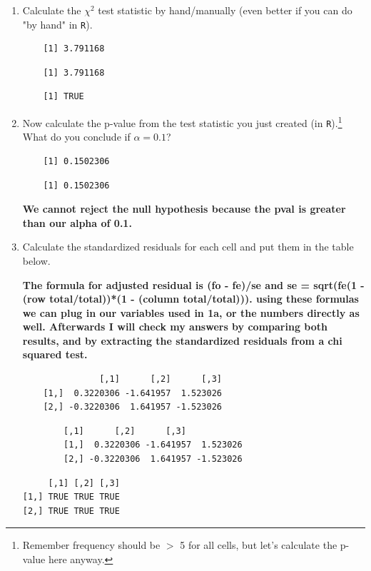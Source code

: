\documentclass[12pt,letterpaper]{article}
\begin{document}
\begin{enumerate}
	
	\item [(a)]
	Calculate the $\chi^2$ test statistic by hand/manually (even better if you can do "by hand" in \texttt{R}).\\	
	 
	\begin{verbatim}
	[1] 3.791168	
	\end{verbatim}
	 
	\begin{verbatim}
	[1] 3.791168
	\end{verbatim}
	 
	\begin{verbatim}
	[1] TRUE	
	\end{verbatim}
	
	\item [(b)]
	Now calculate the p-value from the test statistic you just created (in \texttt{R}).\footnote{Remember frequency should be $>$ 5 for all cells, but let's calculate the p-value here anyway.}  What do you conclude if $\alpha = 0.1$?\\
		 
	\begin{verbatim}
	[1] 0.1502306	
	\end{verbatim}
	 
	\begin{verbatim}
	[1] 0.1502306
	\end{verbatim}
	\textbf {We cannot reject the null hypothesis because the pval is greater than our alpha of 0.1.}

	\item [(c)] Calculate the standardized residuals for each cell and put them in the table below.
	
\textbf {The formula for adjusted residual is (fo - fe)/se and se = sqrt(fe(1 - (row total/total))*(1 - (column total/total))). using these formulas we can plug in our variables used in 1a, or the numbers directly as well. Afterwards I will check my answers by comparing both results, and by extracting the standardized residuals from a chi squared test.}
	
	
		 
	\begin{verbatim}
	           [,1]      [,2]      [,3]
	[1,]  0.3220306 -1.641957  1.523026
	[2,] -0.3220306  1.641957 -1.523026
	\end{verbatim}
			 
	\begin{verbatim}
		[,1]      [,2]      [,3]
		[1,]  0.3220306 -1.641957  1.523026
		[2,] -0.3220306  1.641957 -1.523026
	\end{verbatim}
				 
	\begin{verbatim}
     [,1] [,2] [,3]
[1,] TRUE TRUE TRUE
[2,] TRUE TRUE TRUE
	\end{verbatim}
	

\end{enumerate}
\end{document}
